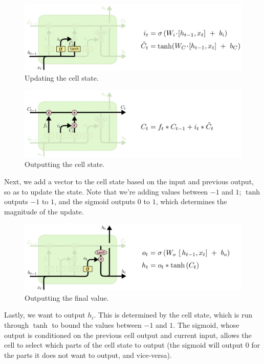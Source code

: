 \documentclass{article}
\begin{document}
    \begin{figure}[H]
        \centerline{\includegraphics[scale=0.4]{LSTM2.png}}
        \caption{Updating the cell state.}
        \label{fig:lstm2}
    \end{figure}
    \begin{figure}[H]
        \centerline{\includegraphics[scale=0.4]{LSTM3.png}}
        \caption{Outputting the cell state.}
        \label{fig:lstm3}
    \end{figure}
    Next, we add a vector to the cell state based on the input and previous output, so as to update the state. Note that we're adding values between $-1$ and $1$; $\tanh$ outputs $-1$ to $1$, and the sigmoid outputs $0$ to $1$, which determines the magnitude of the update. 
    \begin{figure}[H]
        \centerline{\includegraphics[scale=0.4]{LSTM4.png}}
        \caption{Outputting the final value.}
        \label{fig:lstm4}
    \end{figure}
    Lastly, we want to output $h_i$. This is determined by the cell state, which is run through $\tanh$ to bound the values between $-1$ and $1$. The sigmoid, whose output is conditioned on the previous cell output and current input, allows the cell to select which parts of the cell state to output (the sigmoid will output $0$ for the parts it does not want to output, and vice-versa). 
    
\end{document}
